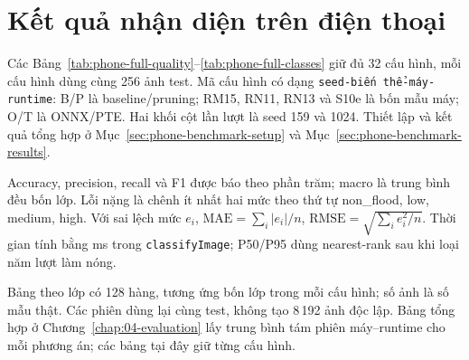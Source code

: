 \section{Kết quả nhận diện trên điện thoại}\label{sec:phone-full-results}
Các Bảng~\ref{tab:phone-full-quality}--\ref{tab:phone-full-classes} giữ đủ 32 cấu hình, mỗi cấu hình dùng cùng 256 ảnh test. Mã cấu hình có dạng \texttt{seed-biến thể-máy-runtime}: B/P là baseline/pruning; RM15, RN11, RN13 và S10e là bốn mẫu máy; O/T là ONNX/PTE. Hai khối cột lần lượt là seed 159 và 1024. Thiết lập và kết quả tổng hợp ở Mục~\ref{sec:phone-benchmark-setup} và Mục~\ref{sec:phone-benchmark-results}.

Accuracy, precision, recall và F1 được báo theo phần trăm; macro là trung bình đều bốn lớp. Lỗi nặng là chênh ít nhất hai mức theo thứ tự non\_flood, low, medium, high. Với sai lệch mức \(e_i\), \(\mathrm{MAE}=\sum_i|e_i|/n\), \(\mathrm{RMSE}=\sqrt{\sum_i e_i^2/n}\). Thời gian tính bằng ms trong \texttt{classifyImage}; P50/P95 dùng nearest-rank sau khi loại năm lượt làm nóng.






\FloatBarrier



Bảng theo lớp có 128 hàng, tương ứng bốn lớp trong mỗi cấu hình; số ảnh là số mẫu thật. Các phiên dùng lại cùng test, không tạo 8\,192 ảnh độc lập. Bảng tổng hợp ở Chương~\ref{chap:04-evaluation} lấy trung bình tám phiên máy--runtime cho mỗi phương án; các bảng tại đây giữ từng cấu hình.
